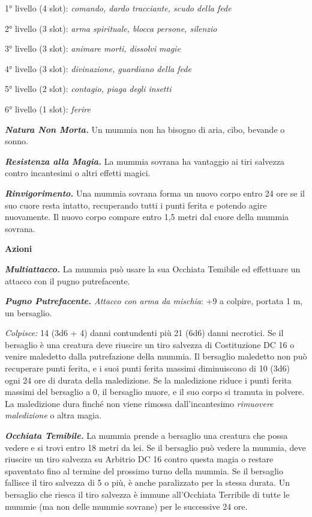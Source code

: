 \begin{multicols}{2}
1° livello (4 slot): \emph{comando, dardo tracciante, scudo della fede}

2° livello (3 slot): \emph{arma spirituale, blocca persone, silenzio}

3° livello (3 slot): \emph{animare morti, dissolvi magie}

4° livello (3 slot): \emph{divinazione, guardiano della fede}

5° livello (2 slot): \emph{contagio, piaga degli insetti}

6° livello (1 slot): \emph{ferire}

\emph{\textbf{Natura Non Morta.}} Un mummia non ha bisogno di aria,
cibo, bevande o sonno.

\emph{\textbf{Resistenza alla Magia.}} La mummia sovrana ha vantaggio ai
tiri salvezza contro incantesimi o altri effetti magici.

\emph{\textbf{Rinvigorimento.}} Una mummia sovrana forma un nuovo corpo
entro 24 ore se il suo cuore resta intatto, recuperando tutti i punti
ferita e potendo agire nuovamente. Il nuovo corpo compare entro 1,5
metri dal cuore della mummia sovrana.

\smallskip\textbf{Azioni}

\emph{\textbf{Multiattacco.}} La mummia può usare la sua Occhiata
Temibile ed effettuare un attacco con il pugno putrefacente.

\emph{\textbf{Pugno Putrefacente.} Attacco con arma da mischia}: +9 a
colpire, portata 1 m, un bersaglio.

\emph{Colpisce:} 14 (3d6 + 4) danni contundenti più 21 (6d6) danni
necrotici. Se il bersaglio è una creatura deve riuscire un tiro salvezza
di Costituzione DC 16 o venire maledetto dalla putrefazione della
mummia. Il bersaglio maledetto non può recuperare punti ferita, e i suoi
punti ferita massimi diminuiscono di 10 (3d6) ogni 24 ore di durata
della maledizione. Se la maledizione riduce i punti ferita massimi del
bersaglio a 0, il bersaglio muore, e il suo corpo si tramuta in polvere.
La maledizione dura finché non viene rimossa dall'incantesimo
\emph{rimuovere maledizione} o altra magia.

\emph{\textbf{Occhiata Temibile.}} La mummia prende a bersaglio una
creatura che possa vedere e si trovi entro 18 metri da lei. Se il
bersaglio può vedere la mummia, deve riuscire un tiro salvezza su Arbitrio DC 16 contro questa magia o restare spaventato fino al termine
del prossimo turno della mummia. Se il bersaglio fallisce il tiro
salvezza di 5 o più, è anche paralizzato per la stessa durata. Un
bersaglio che riesca il tiro salvezza è immune all'Occhiata Terribile di
tutte le mummie (ma non delle mummie sovrane) per le successive 24 ore.


\end{multicols}
